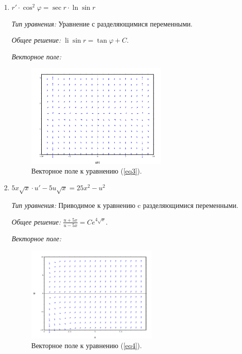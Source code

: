 \documentclass[14pt, a4paper, titlepage, fleqn]{extarticle}
\DeclareMathOperator{\li}{li}
\begin{document}
\begin{enumerate}
                \item \( r' \cdot \cos^2{\varphi} = \sec{r} \cdot \ln{\sin{r}} \)
                    \label{eq3}

                    \textit{Тип уравнения:}
                        Уравнение с разделяющимися переменными.

                    \textit{Общее решение:}
                        \( \li{\sin{r}} = \tan{\varphi} + C. \)

                    \textit{Векторное поле:}

                        \begin{figure}[H]
                            \centering
                            \includegraphics[width=7cm]{pictures/vector_field_3.pdf}
                            \caption{Векторное поле к уравнению (\ref{eq3}).}
                        \end{figure}
                
                \item \( 5x\sqrt{x} \cdot u' -5u\sqrt{x} = 25x^2 - u^2 \)
                    \label{eq4}

                    \textit{Тип уравнения:}
                        Приводимое к уравнению c разделяющимися переменными.

                    \textit{Общее решение:}
                        \(
                            \displaystyle
                            \frac{u+5x}{u-5x} = C e^{4 \sqrt{x}}.
                        \)

                    \textit{Векторное поле:}

                        \begin{figure}[H]
                            \centering
                            \includegraphics[width=6.5cm]{pictures/vector_field_4.pdf}
                            \caption{Векторное поле к уравнению (\ref{eq4}).}
                        \end{figure}
                

\end{enumerate}
\end{document}
